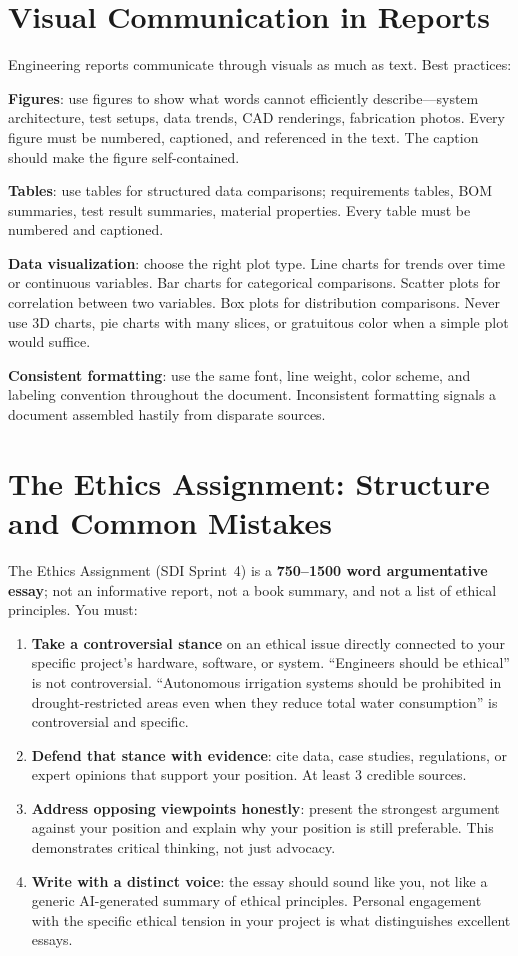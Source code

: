 \section{Visual Communication in Reports}
Engineering reports communicate through visuals as much as text. Best practices:

\textbf{Figures}: use figures to show what words cannot efficiently describe---system architecture, test setups, data trends, CAD renderings, fabrication photos. Every figure must be numbered, captioned, and referenced in the text. The caption should make the figure self-contained.

\textbf{Tables}: use tables for structured data comparisons; requirements tables, BOM summaries, test result summaries, material properties. Every table must be numbered and captioned.

\textbf{Data visualization}: choose the right plot type. Line charts for trends over time or continuous variables. Bar charts for categorical comparisons. Scatter plots for correlation between two variables. Box plots for distribution comparisons. Never use 3D charts, pie charts with many slices, or gratuitous color when a simple plot would suffice.

\textbf{Consistent formatting}: use the same font, line weight, color scheme, and labeling convention throughout the document. Inconsistent formatting signals a document assembled hastily from disparate sources.



\section{The Ethics Assignment: Structure and Common Mistakes}
The Ethics Assignment (SDI Sprint~4) is a \textbf{750--1500 word argumentative essay}; not an informative report, not a book summary, and not a list of ethical principles. You must:

\begin{enumerate}[nosep,leftmargin=1.5em]
\item \textbf{Take a controversial stance} on an ethical issue directly connected to your specific project's hardware, software, or system. ``Engineers should be ethical'' is not controversial. ``Autonomous irrigation systems should be prohibited in drought-restricted areas even when they reduce total water consumption'' is controversial and specific.
\item \textbf{Defend that stance with evidence}: cite data, case studies, regulations, or expert opinions that support your position. At least 3 credible sources.
\item \textbf{Address opposing viewpoints honestly}: present the strongest argument against your position and explain why your position is still preferable. This demonstrates critical thinking, not just advocacy.
\item \textbf{Write with a distinct voice}: the essay should sound like you, not like a generic AI-generated summary of ethical principles. Personal engagement with the specific ethical tension in your project is what distinguishes excellent essays.
\end{enumerate}

